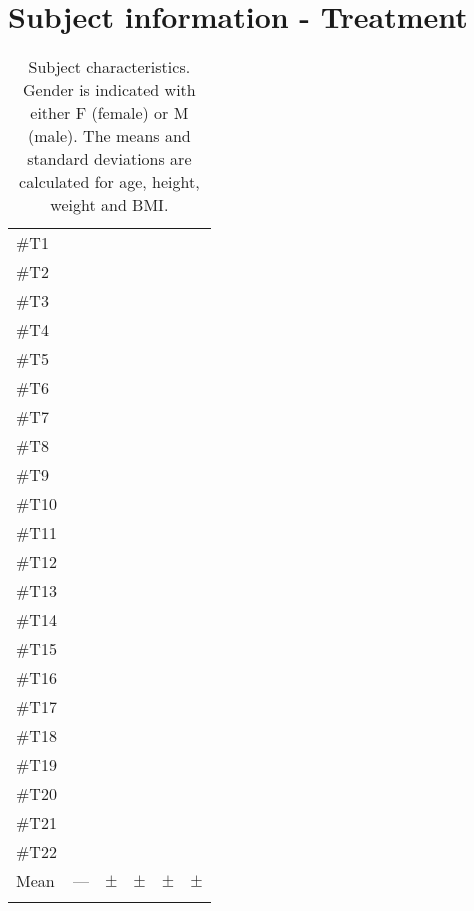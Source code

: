 \section{Subject information - Treatment}
\begin{longtable}{l|c|c|c|c|c}
	\rowcolor[HTML]{C0C0C0} \rule{0pt}{3ex}  \color[HTML]{000000}{Subject} & \color[HTML]{000000}{Gender} & \color[HTML]{000000}{Age} & \color[HTML]{000000}{Weight} & \color[HTML]{000000}{Height} &  \color[HTML]{000000}{BMI} 
	\\ \hline \rule{0pt}{3ex} 
\#T1 &  &  &  &  & \\ \hline \hline \rule{0pt}{3ex} 
\#T2 &  &  &  &  & \\ \hline \hline \rule{0pt}{3ex} 
\#T3 &  &  &  &  & \\ \hline \hline \rule{0pt}{3ex} 
\#T4 &  &  &  &  & \\ \hline \hline \rule{0pt}{3ex} 
\#T5 &  &  &  &  & \\ \hline \hline \rule{0pt}{3ex} 
\#T6 &  &  &  &  & \\ \hline \hline \rule{0pt}{3ex} 
\#T7 &  &  &  &  & \\ \hline \hline \rule{0pt}{3ex} 
	\#T8 &  &  &  &  & \\ \hline \hline \rule{0pt}{3ex} 
	\#T9 &  &  &  &  & \\ \hline \hline \rule{0pt}{3ex} 
	\#T10 &  &  &  &  & \\ \hline \hline \rule{0pt}{3ex} 
	\#T11 &  &  &  &  & \\ \hline \hline \rule{0pt}{3ex} 
\#T12 &  &  &  &  & \\ \hline \hline \rule{0pt}{3ex} 
\#T13 &  &  &  &  & \\ \hline \hline \rule{0pt}{3ex} 
\#T14 &  &  &  &  & \\ \hline \hline \rule{0pt}{3ex} 
\#T15 &  &  &  &  & \\ \hline \hline \rule{0pt}{3ex} 
\#T16 &  &  &  &  & \\ \hline \hline \rule{0pt}{3ex} 
\#T17 &  &  &  &  & \\ \hline \hline \rule{0pt}{3ex} 
	\#T18 &  &  &  &  & \\ \hline \hline \rule{0pt}{3ex} 
	\#T19 &  &  &  &  & \\ \hline \hline \rule{0pt}{3ex} 
	\#T20 &  &  &  &  & \\ \hline \hline \rule{0pt}{3ex}
		\#T21&  &  &  &  & \\ \hline \hline \rule{0pt}{3ex} 
	\#T22 &  &  &  &  & \\ \hline \hline \rule{0pt}{3ex}  
	Mean & --- & $\pm$  &  $\pm$ &  $\pm$  &  $\pm$
	\\ \hline 
	\caption{Subject characteristics. Gender is indicated with either F (female) or M (male). The means and standard deviations are calculated for age, height, weight and BMI.}
	\label{tab:subjects}
\end{longtable}
\vspace{-.5cm}


